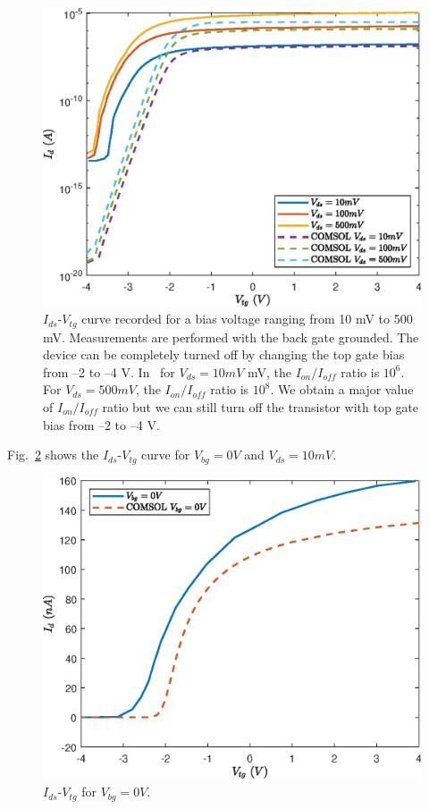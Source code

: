 \documentclass[12pt,a4paper,titlepage]{article}
\begin{document}
\begin{figure}[H]
	\centering
	\includegraphics[width=.8\textwidth]{Grafici/Id(Vtg)_HfO2_MoS2_varying_Vds.eps} 
	\caption{$I_{ds}$-$V_{tg}$ curve recorded for a bias voltage ranging from 10 mV to 500 mV. Measurements are performed with the back gate grounded. The device can be completely turned off by changing the top gate bias from –2 to –4 V. In~\cite{Radisavljevic:Si_MoS2} for $V_{ds} = 10 mV$ mV, the $I_{on}/I_{off}$ ratio is $10^6$. For $V_{ds} = 500 mV$, the $I_{on}/I_{off}$ ratio is $10^8$. We obtain a major value of $I_{on}/I_{off}$ ratio but we can still turn off the transistor with top gate bias from –2 to –4 V.}
	\label{fig:Id(Vtg)_HfO2_MoS2_varying_Vds}
\end{figure}

Fig.~\ref{fig:Id(Vtg)_HfO2_MoS2_varying_Vbg} shows the $I_{ds}$-$V_{tg}$ curve for $V_{bg}=0V$ and $V_{ds}=10mV$.

\begin{figure}[H]
	\centering
	\includegraphics[width=.7\textwidth]{Grafici/Id(Vtg)_HfO2_MoS2_varying_Vbg.eps} 
	\caption{$I_{ds}$-$V_{tg}$ for $V_{bg}=0V$.}
	\label{fig:Id(Vtg)_HfO2_MoS2_varying_Vbg}
\end{figure}
\end{document}
